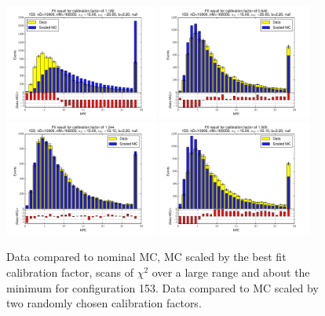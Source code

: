\begin{figure}[htbp]
\begin{center}
\includegraphics[width=0.45\textwidth]{../FIGURES/153/FIG_Fit_result_for_calibration_factor_of_1_180.pdf} 
\includegraphics[width=0.45\textwidth]{../FIGURES/153/FIG_Fit_result_for_calibration_factor_of_0_640.pdf} 
\includegraphics[width=0.45\textwidth]{../FIGURES/153/FIG_Fit_result_for_calibration_factor_of_1_244.pdf} 
\includegraphics[width=0.45\textwidth]{../FIGURES/153/FIG_Fit_result_for_calibration_factor_of_1_000.pdf} 
\caption{Data compared to nominal MC, MC scaled by the best fit calibration factor, scans of $\chi^2$ over a large range and about the minimum for configuration 153. Data compared to MC scaled by two randomly chosen calibration factors.} 
\label{tab:best_153} 
\end{center} \end{figure} 

